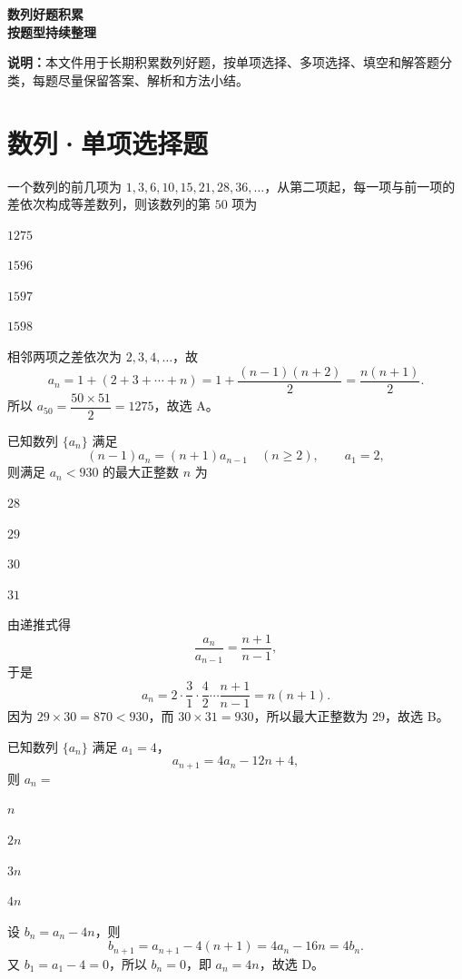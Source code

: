 \documentclass[zihao=-4]{exam-zh}
\begin{document}
\begin{center}
  {\bfseries 数列好题积累}\\[4pt]
  {\bfseries 按题型持续整理}
\end{center}

\noindent\textbf{说明：}本文件用于长期积累数列好题，按单项选择、多项选择、填空和解答题分类，每题尽量保留答案、解析和方法小结。

\section{数列·单项选择题}

\begin{question}[points=5]
一个数列的前几项为 $1,3,6,10,15,21,28,36,\ldots$，从第二项起，每一项与前一项的差依次构成等差数列，则该数列的第 $50$ 项为 \paren[A]
\begin{choices}
  \item $1275$
  \item $1596$
  \item $1597$
  \item $1598$
\end{choices}
\begin{solution}
相邻两项之差依次为 $2,3,4,\ldots$，故
\[
  a_n=1+(2+3+\cdots+n)=1+\frac{(n-1)(n+2)}2=\frac{n(n+1)}2.
\]
所以 $a_{50}=\dfrac{50\times51}{2}=1275$，故选 A。
\end{solution}
\end{question}

\begin{question}[points=5]
已知数列 $\{a_n\}$ 满足
\[
  (n-1)a_n=(n+1)a_{n-1}\quad(n\ge 2),\qquad a_1=2,
\]
则满足 $a_n<930$ 的最大正整数 $n$ 为 \paren[B]
\begin{choices}
  \item $28$
  \item $29$
  \item $30$
  \item $31$
\end{choices}
\begin{solution}
由递推式得
\[
 \frac{a_n}{a_{n-1}}=\frac{n+1}{n-1},
\]
于是
\[
 a_n=2\cdot\frac31\cdot\frac42\cdots\frac{n+1}{n-1}=n(n+1).
\]
因为 $29\times30=870<930$，而 $30\times31=930$，所以最大正整数为 $29$，故选 B。
\end{solution}
\end{question}

\begin{question}[points=5]
已知数列 $\{a_n\}$ 满足 $a_1=4$，
\[
 a_{n+1}=4a_n-12n+4,
\]
则 $a_n=$ \paren[D]
\begin{choices}
  \item $n$
  \item $2n$
  \item $3n$
  \item $4n$
\end{choices}
\begin{solution}
设 $b_n=a_n-4n$，则
\[
 b_{n+1}=a_{n+1}-4(n+1)=4a_n-16n=4b_n.
\]
又 $b_1=a_1-4=0$，所以 $b_n=0$，即 $a_n=4n$，故选 D。
\end{solution}
\end{question}
\end{document}

